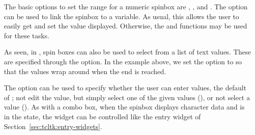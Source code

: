 The basic options to set the range for a numeric spinbox are
, , and
.  The 
option can be used to link the spinbox to a \TCL\/ variable. As usual,
this allows the user to easily get and set the value
displayed. Otherwise, the  and 
functions may be used for these tasks. 

As seen, in \TK, spin boxes can also be used to select from a list of
text values. These are specified through the
 option. In the  example
above, we set the  option to  so
that the values wrap around when the end is reached.
 
The option  can be used to specify whether
the user can enter values, the default of ; not edit the
value, but simply select one of the given values (),
or not select a value ().  As with a combo box, when
the \TK\/ spinbox displays character data and is in the 
state, the widget can be controlled like the entry widget of
Section~\ref{sec:tcltk:entry-widgets}.




